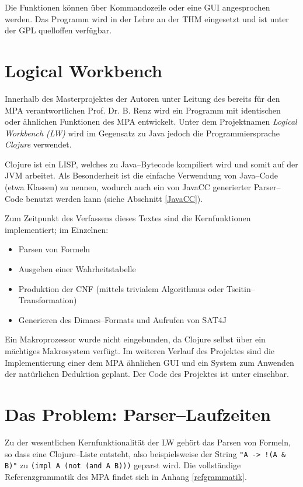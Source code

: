 \documentclass[ngerman,a4paper,abstracton,open=right,twoside=false,toc=listofnumbered,bibtotocnumbered]{scrreprt}
\begin{document}
Die Funktionen können über Kommandozeile oder eine GUI angesprochen werden. Das Programm wird in der Lehre an der THM eingesetzt und ist unter der GPL quelloffen verfügbar.

\section{Logical Workbench}

Innerhalb des Masterprojektes der Autoren unter Leitung des bereits für den MPA verantwortlichen Prof. Dr. B. Renz wird ein Programm mit identischen oder ähnlichen Funktionen des MPA entwickelt. Unter dem Projektnamen \emph{Logical Workbench (LW)} wird im Gegensatz zu Java jedoch die Programmiersprache \emph{Clojure} verwendet.

Clojure ist ein LISP, welches zu Java--Bytecode kompiliert wird und somit auf der JVM arbeitet. Als Besonderheit ist die einfache Verwendung von Java--Code (etwa Klassen) zu nennen, wodurch auch ein von JavaCC generierter Parser--Code benutzt werden kann (siehe Abschnitt \ref{JavaCC}).

Zum Zeitpunkt des Verfassens dieses Textes sind die Kernfunktionen implementiert; im Einzelnen:

\begin{itemize}
	\item Parsen von Formeln
	\item Ausgeben einer Wahrheitstabelle
	\item Produktion der CNF (mittels trivialem Algorithmus oder Tseitin--Transformation)
	\item Generieren des Dimacs--Formats und Aufrufen von SAT4J
\end{itemize}

Ein Makroprozessor wurde nicht eingebunden, da Clojure selbst über ein mächtiges Makrosystem verfügt. Im weiteren Verlauf des Projektes sind die Implementierung einer dem MPA ähnlichen GUI und ein System zum Anwenden der natürlichen Deduktion geplant. Der Code des Projektes ist unter \cite{lw} einsehbar.

\section{Das Problem: Parser--Laufzeiten}

Zu der wesentlichen Kernfunktionalität der LW gehört das Parsen von Formeln, so dass eine Clojure--Liste entsteht, also beispielsweise der String \lstinline|"A -> !(A & B)"| zu \lstinline|(impl A (not (and A B)))| geparst wird. Die vollständige Referenzgrammatik des MPA findet sich in Anhang \ref{refgrammatik}.
\end{document}
